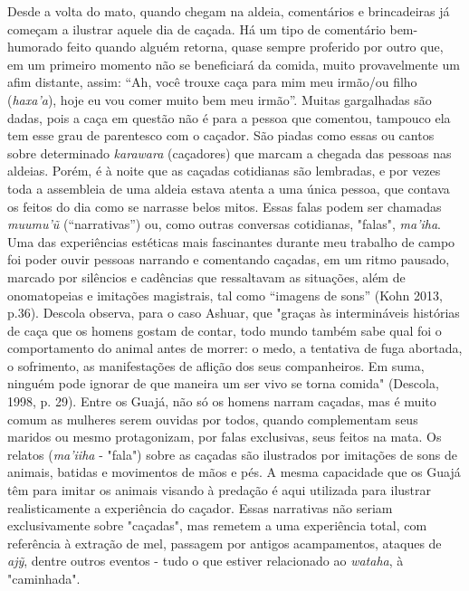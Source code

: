 Desde a volta do mato, quando chegam na aldeia, comentários e
brincadeiras já começam a ilustrar aquele dia de caçada. Há um tipo de
comentário bem-humorado feito quando alguém retorna, quase sempre
proferido por outro que, em um primeiro momento não se beneficiará da
comida, muito provavelmente um afim distante, assim: ``Ah, você trouxe
caça para mim meu irmão/ou filho (\emph{haxa'a}), hoje eu vou comer
muito bem meu irmão''. Muitas gargalhadas são dadas, pois a caça em
questão não é para a pessoa que comentou, tampouco ela tem esse grau de
parentesco com o caçador. São piadas como essas ou cantos sobre
determinado \emph{karawara} (caçadores) que marcam a chegada das pessoas
nas aldeias. Porém, é à noite que as caçadas cotidianas são lembradas, e
por vezes toda a assembleia de uma aldeia estava atenta a uma única
pessoa, que contava os feitos do dia como se narrasse belos mitos. Essas
falas podem ser chamadas \emph{muumu'ũ} (``narrativas'') ou, como outras
conversas cotidianas, "falas", \emph{ma'iha}. Uma das experiências
estéticas mais fascinantes durante meu trabalho de campo foi poder ouvir
pessoas narrando e comentando caçadas, em um ritmo pausado, marcado por
silêncios e cadências que ressaltavam as situações, além de onomatopeias
e imitações magistrais, tal como ``imagens de sons'' (Kohn 2013, p.36).
Descola observa, para o caso Ashuar, que "graças às intermináveis
histórias de caça que os homens gostam de contar, todo mundo também sabe
qual foi o comportamento do animal antes de morrer: o medo, a tentativa
de fuga abortada, o sofrimento, as manifestações de aflição dos seus
companheiros. Em suma, ninguém pode ignorar de que maneira um ser vivo
se torna comida" (Descola, 1998, p. 29). Entre os Guajá, não só os
homens narram caçadas, mas é muito comum as mulheres serem ouvidas por
todos, quando complementam seus maridos ou mesmo protagonizam, por falas
exclusivas, seus feitos na mata. Os relatos (\emph{ma'iiha} - "fala")
sobre as caçadas são ilustrados por imitações de sons de animais,
batidas e movimentos de mãos e pés. A mesma capacidade que os Guajá têm
para imitar os animais visando à predação é aqui utilizada para ilustrar
realisticamente a experiência do caçador. Essas narrativas não seriam
exclusivamente sobre "caçadas", mas remetem a uma experiência total, com
referência à extração de mel, passagem por antigos acampamentos, ataques
de \emph{ajỹ}, dentre outros eventos - tudo o que estiver relacionado ao
\emph{wataha}, à "caminhada".

